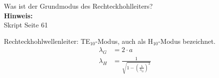 \begin{question}[section=6,name={Grundmodus},difficulty=,quantity=4,type=thr,tags={20130513}]
	Was ist der Grundmodus des Rechteckhohlleiters?
	\\ \textbf{Hinweis:}\\
	Skript Seite 61
\end{question}
\begin{solution}
	Rechteckhohlwellenleiter: TE$_{10}$-Modus, auch als H$_{10}$-Modus bezeichnet.
	\begin{align}
		\lambda_G &= 2 \cdot a \qquad\quad \\ 
		\lambda_H &= \frac{1}{\sqrt{1-\left(\frac{\lambda}{\lambda_G}\right)^2}}
	\end{align}
\end{solution}